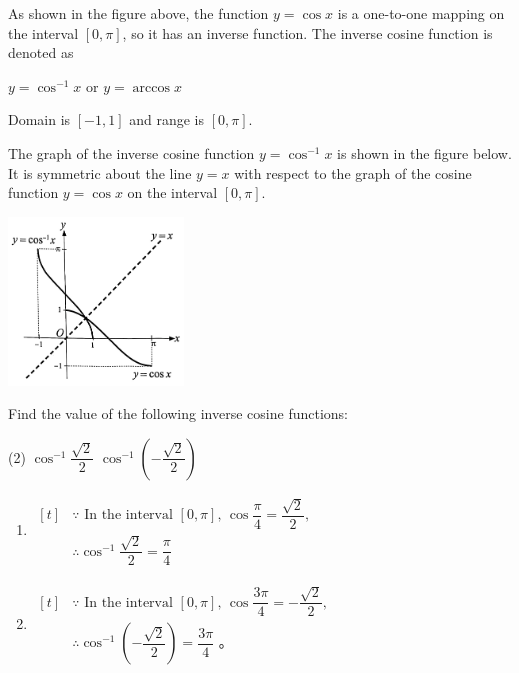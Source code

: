 \documentclass{report}
\begin{document}
As shown in the figure above, the function \( y=\cos x \) is a one-to-one mapping on the interval \( [0, \pi] \), so it has an inverse function. The inverse cosine function is denoted as
\begin{info}
    
    \noindent $y=\cos^{-1} x \text{ or } y=\arccos x $
    
    \noindent Domain is \( [-1,1] \) and range is \( [0, \pi] \).
\end{info}

The graph of the inverse cosine function \( y=\cos^{-1} x \) is shown in the figure below. It is symmetric about the line \( y=x \) with respect to the graph of the cosine function \( y=\cos x \) on the interval \( [0, \pi] \).
\begin{center}
    \includegraphics[width=0.35\textwidth]{assets/9-38.jpg}
\end{center}
\begin{question}
    Find the value of the following inverse cosine functions:
    \begin{tasks}[label=(\alph*)](2)
        \task $\cos ^{-1} \dfrac{\sqrt{2}}{2}$
        \task $\cos ^{-1}\left(-\dfrac{\sqrt{2}}{2}\right)$
    \end{tasks}

    \sol{}
    \vspace{-1em}
    \begin{enumerate}[label=(\alph*)]
        \item $\begin{aligned}[t] & \because \text { In the interval }[0, \pi] \text {, } \cos \dfrac{\pi}{4}=\dfrac{\sqrt{2}}{2} \text {, } \\ & \therefore \cos ^{-1} \dfrac{\sqrt{2}}{2}=\dfrac{\pi}{4}\end{aligned}$
        \item $\begin{aligned}[t] & \because \text { In the interval }[0, \pi] \text {, } \cos \dfrac{3 \pi}{4}=-\dfrac{\sqrt{2}}{2} \text {, } \\ & \therefore \cos ^{-1}\left(-\dfrac{\sqrt{2}}{2}\right)=\dfrac{3 \pi}{4} \text { 。 }\end{aligned}$
    \end{enumerate}
\end{question}
\end{document}
